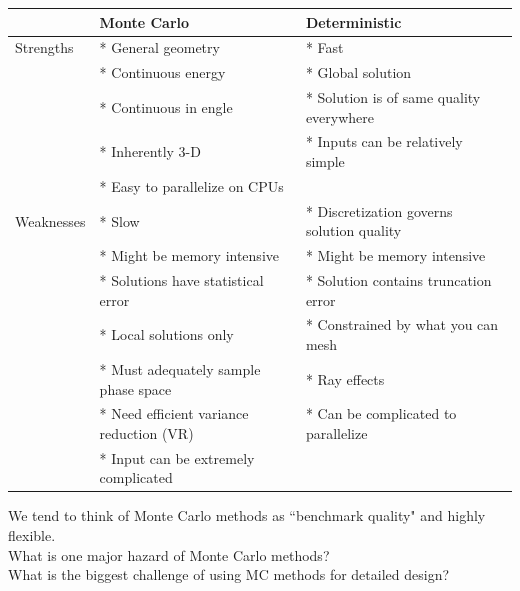 \documentclass[12pt]{article}
\begin{document}
\begin{center}
\begin{small}
\begin{tabu}{| l | X | X |}
  \hline
  & Monte Carlo         & Deterministic \\\hline
    Strengths & * General geometry    & * Fast \\
              & * Continuous energy   & * Global solution\\
              & * Continuous in engle & * Solution is of same quality 
                                          everywhere\\
              & * Inherently 3-D      & * Inputs can be relatively simple \\
              & * Easy to parallelize on CPUs & \\\hline
    Weaknesses & * Slow & * Discretization governs solution quality \\
               & * Might be memory intensive & * Might be memory intensive \\
               & * Solutions have statistical error & * Solution contains 
                                                        truncation error\\
               & * Local solutions only & * Constrained by what you can mesh \\
               & * Must adequately sample phase space & * Ray effects \\
               & * Need efficient variance reduction (VR) & * Can be complicated to parallelize \\
               & * Input can be extremely complicated & \\\hline
\end{tabu}
\end{small}
\end{center}
We tend to think of Monte Carlo methods as ``benchmark quality" and highly flexible. \\
What is one major hazard of Monte Carlo methods?\\
What is the biggest challenge of using MC methods for detailed design?
\end{document}
